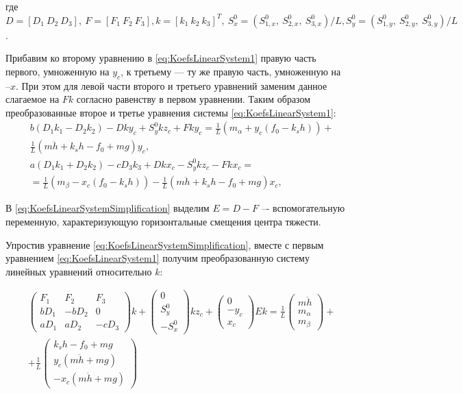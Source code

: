 где $D=\left[D_1~D_2~D_3\right],~F=\left[F_1~F_2~F_3\right], k=\left[k_1~k_2~k_3\right]^T,~S^0_x=\left(S^0_{1,x},~S^0_{2,x},~S^0_{3,x}\right)/L, S^0_y=\left(S^0_{1,y},~S^0_{2,y},~S^0_{3,y}\right)/L$.

Прибавим ко второму уравнению в \ref{eq:KoefsLinearSystem1} правую часть первого, умноженную на $y_c$, к третьему –-- ту же правую часть, умноженную на $–x$. При этом для левой части второго и третьего уравнений заменим данное слагаемое на $Fk$ согласно равенству в первом уравнении. Таким образом преобразованные второе и третье уравнения системы \ref{eq:KoefsLinearSystem1}:
\begin{equation}
\label{eq:KoefsLinearSystemSimplification}
\begin{aligned}
& b\left(D_1k_1-D_2k_2\right)-Dky_c + S_y^0kz_c + Fky_c = \frac{1}{L}\left(m_{\alpha} + y_c\left(f_0 - k_sh\right)\right) + \\ & \frac{1}{L}\left(m\ddot{h}+k_sh-f_0+mg\right)y_c, \\
& a\left(D_1k_1+D_2k_2\right)-cD_3k_3+Dkx_c-S_y^0kz_c - Fkx_c = \\ & = \frac{1}{L}\left(m_{\beta} - x_c\left(f_0 - k_sh\right)\right) - \frac{1}{L}\left(m\ddot{h}+k_sh-f_0+mg\right)x_c,
\end{aligned}
\end{equation}

В \ref{eq:KoefsLinearSystemSimplification} выделим $E=D-F$ –- вспомогательную переменную, характеризующую горизонтальные смещения центра тяжести.

Упростив уравнение \ref{eq:KoefsLinearSystemSimplification}, вместе с первым уравнением  \ref{eq:KoefsLinearSystem1} получим преобразованную систему линейных уравнений относительно $k$:

\begin{equation}
\label{eq:KoefsLinearSystem2}
\begin{aligned}
& \begin{pmatrix}
F_1 & F_2 & F_3 \\
bD_1 & -bD_2 & 0 \\
aD_1 & aD_2 & -cD_3
\end{pmatrix}k +
\begin{pmatrix}0 \\ S_y^0 \\ -S_x^0\end{pmatrix}kz_c +
\begin{pmatrix}0 \\ -y_c \\ x_c \end{pmatrix}Ek = \frac{1}{L}
\begin{pmatrix}
m\ddot{h} \\
m_{\alpha} \\
m_{\beta}
\end{pmatrix} + \\
& + \frac{1}{L}\begin{pmatrix}
k_sh - f_0 + mg \\
y_c(m\ddot{h} + mg) \\
-x_c(m\ddot{h} + mg)
\end{pmatrix}
\end{aligned}
\end{equation}

